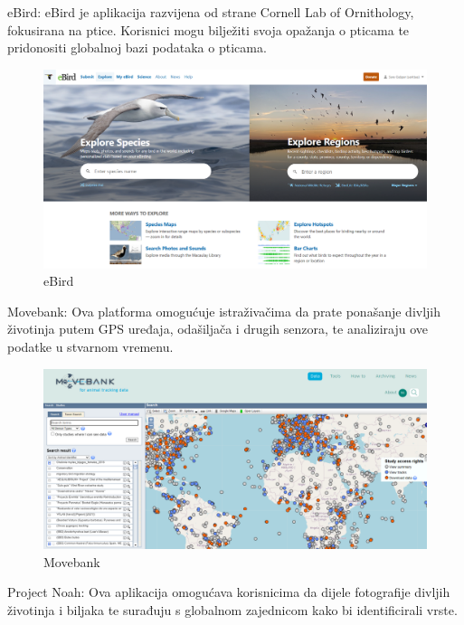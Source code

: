 \begin{packed_item}
			\item eBird: eBird je aplikacija razvijena od strane Cornell Lab of Ornithology, fokusirana na ptice. Korisnici mogu bilježiti svoja opažanja o pticama te pridonositi globalnoj bazi podataka o pticama.
			\begin{figure}[H]
				\includegraphics[width=\textwidth]{slike/ebird.PNG} %
				\caption{eBird}
				\label{fig:ebird} %
			\end{figure}
			\item Movebank: Ova platforma omogućuje istraživačima da prate ponašanje divljih životinja putem GPS uređaja, odašiljača i drugih senzora, te analiziraju ove podatke u stvarnom vremenu.
			\begin{figure}[H]
				\includegraphics[width=\textwidth]{slike/movebank.PNG} %
				\caption{Movebank}
				\label{fig:movebank} %
			\end{figure}
			\item Project Noah: Ova aplikacija omogućava korisnicima da dijele fotografije divljih životinja i biljaka te surađuju s globalnom zajednicom kako bi identificirali vrste.
			\begin{figure}[H]

\end{figure}
\end{packed_item}
